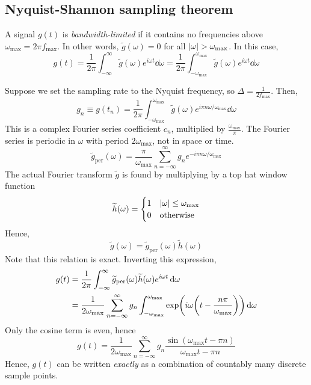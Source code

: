\subsection{Nyquist-Shannon sampling theorem}
\begin{definition}
	A signal \( g(t) \) is \textit{bandwidth-limited} if it contains no frequencies above \( \omega_{\max} = 2\pi f_{\max} \).
	In other words, \( \widetilde g(\omega) = 0 \) for all \( \abs{\omega} > \omega_{\max} \).
	In this case,
	\[
		g(t) = \frac{1}{2\pi} \int_{-\infty}^\infty \widetilde g(\omega) e^{i\omega t} \dd{\omega} = \frac{1}{2\pi} \int_{-\omega_{\max}}^{\omega_{\max}} \widetilde g(\omega) e^{i\omega t} \dd{\omega}
	\]
\end{definition}
\noindent Suppose we set the sampling rate to the Nyquist frequency, so \( \Delta = \frac{1}{2f_{\max}} \).
Then,
\[
	g_n \equiv g(t_n) = \frac{1}{2\pi} \int_{-\omega_{\max}}^{\omega_{\max}} \widetilde g(\omega) e^{i\pi n \omega / \omega_{\max}} \dd{\omega}
\]
This is a complex Fourier series coefficient \( c_n \), multiplied by \( \frac{\omega_{\max}}{\pi} \).
The Fourier series is periodic in \( \omega \) with period \( 2 \omega_{\max} \), not in space or time.
\[
	\widetilde g_\mathrm{per}(\omega) = \frac{\pi}{\omega_{\max}} \sum_{n=-\infty}^\infty g_n e^{-i \pi n \omega / \omega_{\max}}
\]
The actual Fourier transform \( \widetilde g \) is found by multiplying by a top hat window function
\[
	\widetilde h(\omega) = \begin{cases}
		1 & \abs{\omega} \leq \omega_{\max} \\
		0 & \text{otherwise}
	\end{cases}
\]
Hence,
\[
	\widetilde g(\omega) = \widetilde g_\mathrm{per}(\omega) \widetilde h(\omega)
\]
Note that this relation is exact.
Inverting this expression,
\begin{align*}
	g(t) & = \frac{1}{2\pi} \int_{-\infty}^\infty \widetilde g_\mathrm{per}(\omega) \widetilde h(\omega) e^{i \omega t} \dd{\omega}                                     \\
	     & = \frac{1}{2\omega_{\max}} \sum_{n=-\infty}^\infty g_n \int_{-\omega_{\max}}^{\omega_{\max}} \exp(i \omega\qty(t - \frac{n \pi}{\omega_{\max}})) \dd{\omega}
\end{align*}
Only the cosine term is even, hence
\[
	g(t) = \frac{1}{2\omega_{\max}} \sum_{n=-\infty}^\infty g_n \frac{\sin(\omega_{\max} t - \pi n)}{\omega_{\max} t - \pi n}
\]
Hence, \( g(t) \) can be written \textit{exactly} as a combination of countably many discrete sample points.

